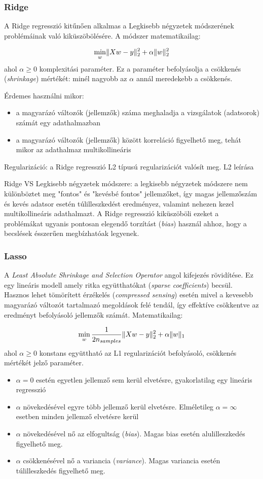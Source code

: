 \subsubsection{Ridge }
A Ridge regresszió kitűnően alkalmas a Legkisebb négyzetek módszerének problémáinak való kiküszöbölésére. 
A módszer matematikailag:

$$ \min_{w} \lVert Xw-y\rVert_2^2 + \alpha \lVert w\rVert_2^2$$ 
ahol $\alpha \geq 0$ komplexitási paraméter. Ez a paraméter befolyásolja a csökkenés (\textit{shrinkage}) mértékét: minél nagyobb az $\alpha$ annál meredekebb a csökkenés. 

Érdemes használni mikor:
\begin{itemize}
	\item a magyarázó változók (jellemzők) száma meghaladja a vizsgálatok (adatsorok) számát egy adathalmazban
	\item a magyarázó változók (jellemzők) között korreláció figyelhető meg, tehát mikor az adathalmaz multikollineáris
\end{itemize}

Regularizáció: a Ridge regresszió L2 típusú regularizációt valósít meg. \TODO L2 leírása


Ridge VS Legkisebb négyzetek módszere: a legkisebb négyzetek módszere nem különböztet meg "fontos" és "kevésbé fontos" jellemzőket, így magas jellemzőszám és kevés adatsor esetén túlilleszkedést eredményez, valamint nehezen kezel multikollineáris adathalmazt. A Ridge regresszió kiküszöböli ezeket a problémákat ugyanis pontosan elegendő torzítást (\textit{bias}) használ ahhoz, hogy a becslések ésszerűen megbízhatóak legyenek.



\subsubsection{Lasso}
A \textit{Least Absolute Shrinkage and Selection Operator} angol kifejezés rövidítése. Ez egy lineáris modell amely ritka együtthatókat (\textit{sparse coefficients}) becsül. Hasznos lehet tömörített érzékelés (\textit{compressed sensing}) esetén mivel a kevesebb magyarázó változót tartalmazó megoldások felé tendál, így effektíve csökkentve az eredményt befolyásoló jellemzők számát. Matematikailag:

$$ \min_{w}\frac{1}{2n_{samples}} \lVert Xw-y\rVert_2^2 + \alpha \lVert w\rVert_1$$
ahol $\alpha \geq 0$ konstans együttható az L1 regularizációt befolyásoló, csökkenés mértékét jelző paraméter. 
\begin{itemize}
	\item $\alpha = 0$ esetén egyetlen jellemző sem kerül elvetésre, gyakorlatilag egy lineáris regresszió
	\item $\alpha$ növekedésével egyre több jellemző kerül elvetésre. Elméletileg $\alpha = \infty$ esetben minden jellemző elvetésre kerül
	\item $\alpha$ növekedésével nő az elfogultság (\textit{bias}). Magas bias esetén alulilleszkedés figyelhető meg.
	\item $\alpha$ csökkenésével nő a variancia (\textit{variance}). Magas variancia esetén túlilleszkedés figyelhető meg.
\end{itemize}

